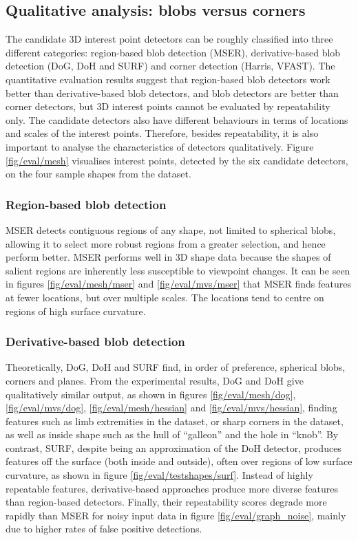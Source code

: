 \subsection{Qualitative analysis: blobs versus corners}
The candidate 3D interest point detectors can be roughly classified into three different categories: region-based blob detection (MSER), derivative-based blob detection (DoG, DoH and SURF) and corner detection (Harris, VFAST). The quantitative evaluation results suggest that region-based blob detectors work better than derivative-based blob detectors, and blob detectors are better than corner detectors, but 3D interest points cannot be evaluated by repeatability only. The candidate detectors also have different behaviours in terms of locations and scales of the interest points. Therefore, besides repeatability, it is also important to analyse the characteristics of detectors qualitatively. Figure \ref{fig/eval/mesh} visualises interest points, detected by the six candidate detectors, on the four sample shapes from the \meshset dataset.

\subsubsection{Region-based blob detection} MSER detects contiguous regions of any shape, \ie not limited to spherical blobs, allowing it to select more robust regions from a greater selection, and hence perform better. MSER performs well in 3D shape data because the shapes of salient regions are inherently less susceptible to viewpoint changes. It can be seen in figures \ref{fig/eval/mesh/mser} and \ref{fig/eval/mvs/mser} that MSER finds features at fewer locations, but over multiple scales. The locations tend to centre on regions of high surface curvature.

\subsubsection{Derivative-based blob detection} Theoretically, DoG, DoH and SURF find, in order of preference, spherical blobs, corners and planes. From the experimental results, DoG and DoH give qualitatively similar output, as shown in figures \ref{fig/eval/mesh/dog}, \ref{fig/eval/mvs/dog}, \ref{fig/eval/mesh/hessian} and \ref{fig/eval/mvs/hessian}, finding features such as limb extremities in the \meshset dataset, or sharp corners in the \stereoset dataset, as well as inside shape such as the hull of ``galleon'' and the hole in ``knob''. By contrast, SURF, despite being an approximation of the DoH detector, produces features off the surface (both inside and outside), often over regions of low surface curvature, as shown in figure \ref{fig/eval/testshapes/surf}. Instead of highly repeatable features, derivative-based approaches produce more diverse features than region-based detectors. Finally, their repeatability scores degrade more rapidly than MSER for noisy input data in figure \ref{fig/eval/graph_noise}, mainly due to higher rates of false positive detections. 


